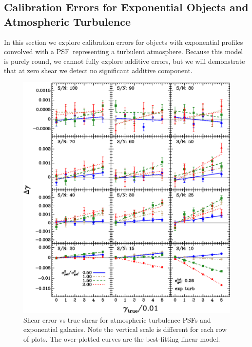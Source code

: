 \documentclass[10pt,preprint]{aastex}
\newcommand{\psf}{PSF}
\begin{document}
\subsection{Calibration Errors for Exponential Objects and Atmospheric Turbulence}

In this section we explore calibration errors for objects with exponential
profiles convolved with a \psf\ representing a turbulent atmosphere.  Because
this model is purely round, we cannot fully explore additive errors, but we
will demonstrate that at zero shear we detect no significant additive component.


\begin{figure}[p] \centering
 \centering 
 \includegraphics[scale=1.1]{figures/set-s2n-et01-vs-shear.eps}

 \caption{Shear error vs true shear for atmospheric turbulence \psf s
 and exponential galaxies.  Note the vertical scale is different for each row
 of plots.  The over-plotted curves are the best-fitting linear model.}
 \label{fig:etdiffvsshroundpsf}

\end{figure}
\end{document}
